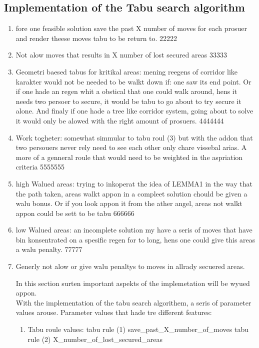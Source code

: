 \subsection{Implementation of the Tabu search algorithm}


\begin{enumerate}
11111\item fore one feasible solution save the past X number of moves for each prosuer and render theese moves tabu to be return to.
22222\item Not alow moves that results in X number of lost secured areas
33333\item Geometri baesed tabus for kritikal areas:
\subitem mening reegens of corridor like karakter would not be needed to be walkt down if: one saw its end point. Or if one hade an regen whit a obstical that one could walk around, hens it needs two persoer to secure, it would be tabu to go about to try secure it alone. And finaly if one hade a tree like corridor system, going about to solve it would only be alowed with the right amount of prosuers.
4444444\item Work togheter:
\subitem somewhat simmular to tabu roul (3) but with the addon that two persouers never rely need to see each other only chare vissebal arias. A more of a genneral roule that would need to be weighted in the aspriation criteria
5555555\item high Walued areas:
\subitem trying to inkoperat the idea of LEMMA1 in the way that the path taken, areas walkt appon in a compleet solution chould be given a walu bonus. Or if you look appon it from the ather angel, areas not walkt appon could be sett to be tabu 
666666\item low Walued areas:
\subitem an incomplete solution my have a seris of moves that have bin konsentrated on a spesific regen for to long, hens one could give this areas a walu penalty.
77777\item Generly not alow or give walu penaltys to moves in allrady secuered areas.





In this section surten important aspekts of the implemetation will be wyued  appon.\\
With the implementation of the tabu search algorithem, a seris of parameter values arouse. Parameter values that hade tre different features: 
\begin{enumerate}
\item Tabu roule values:
\subitem tabu rule (1)  save_past_X_number_of_moves 
\subitem tabu rule (2)  X_number_of_lost_secured_areas


\end{enumerate}
\end{enumerate}
